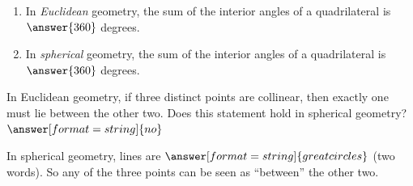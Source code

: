 \documentclass{ximera}
\begin{document}
\begin{problem}
\begin{enumerate}
\item In \emph{Euclidean} geometry, the sum of the interior angles of a quadrilateral is 
$\answer{360}$ degrees.
\item In \emph{spherical} geometry, the sum of the interior angles of a quadrilateral is 
$\answer{360}$ degrees.
\end{enumerate}
\end{problem}

\begin{problem} %
In Euclidean geometry, if three distinct points are collinear, then exactly one must lie between the other two.  Does this statement hold in spherical geometry? 
$\answer[format=string]{no}$

\begin{problem}

In spherical geometry, lines are $\answer[format=string]{great circles}$ (two words).  So any of the three points can be seen as ``between'' the other two.  
\end{problem}
\end{problem}



%
\end{document}

